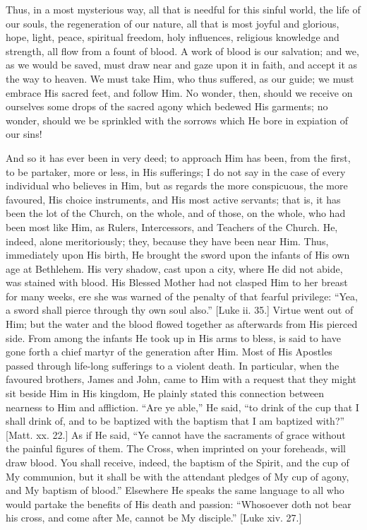 Thus, in a most mysterious way, all that is needful for this sinful
world, the life of our souls, the regeneration of our nature, all that
is most joyful and glorious, hope, light, peace, spiritual freedom,
holy influences, religious knowledge and strength, all flow from a
fount of blood. A work of blood is our salvation; and we, as we would
be saved, must draw near and gaze upon it in faith, and accept it as
the way to heaven. We must take Him, who thus suffered, as our guide;
we must embrace His sacred feet, and follow Him. No wonder, then,
should we receive on ourselves some drops of the sacred agony which
bedewed His garments; no wonder, should we be sprinkled with the
sorrows which He bore in expiation of our sins!

And so it has ever been in very deed; to approach Him has been,
from the first, to be partaker, more or less, in His sufferings; I do
not say in the case of every individual who believes in Him, but as
regards the more conspicuous, the more favoured, His choice
instruments, and His most active servants; that is, it has been the
lot of the Church, on the whole, and of those, on the whole, who had
been most like Him, as Rulers, Intercessors, and Teachers of the
Church. He, indeed, alone meritoriously; they, because they have been
near Him. Thus, immediately upon His birth, He brought the sword upon
the infants of His own age at Bethlehem. His very shadow, cast upon a
city, where He did not abide, was stained with blood. His Blessed
Mother had not clasped Him to her breast for many weeks, ere she was
warned of the penalty of that fearful privilege: ``Yea, a sword
shall pierce through thy own soul also.'' [Luke ii. 35.] Virtue
went out of Him; but the water and the blood flowed together as
afterwards from His pierced side. From among the infants He took up in
His arms to bless, is said to have gone forth a chief martyr of the
generation after Him. Most of His Apostles passed through life-long
sufferings to a violent death. In particular, when the favoured
brothers, James and John, came to Him with a request that they might
sit beside Him in His kingdom, He plainly stated this connection
between nearness to Him and affliction. ``Are ye able,'' He
said, ``to drink of the cup that I shall drink of, and to be
baptized with the baptism that I am baptized with?'' [Matt. xx.
22.] As if He said, ``Ye cannot have the sacraments of grace
without the painful figures of them. The Cross, when imprinted on your
foreheads, will draw blood. You shall receive, indeed, the baptism of
the Spirit, and the cup of My communion, but it shall be with the
attendant pledges of My cup of agony, and My baptism of blood.''
Elsewhere He speaks the same language to all who would partake the
benefits of His death and passion: ``Whosoever doth not bear his
cross, and come after Me, cannot be My disciple.'' [Luke xiv. 27.]

